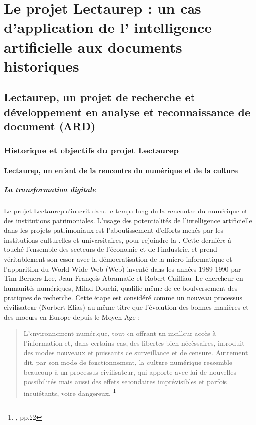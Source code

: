 \part{Le projet Lectaurep : un cas d'application de l' \og intelligence artificielle\fg{}  aux documents historiques}

\chapter{Lectaurep, un projet de recherche et développement en analyse et reconnaissance de document (ARD)}

\section{Historique et objectifs du projet Lectaurep}

\subsection{Lectaurep, un enfant de la rencontre du numérique et de la culture}

\subsubsection{La transformation digitale}

Le projet Lectaurep s'inscrit dans le temps long de la rencontre du numérique et des institutions patrimoniales. L'usage des potentialités de l'intelligence artificielle dans les projets patrimoniaux est l'aboutissement d'efforts menés par les institutions culturelles et universitaires, pour rejoindre la . Cette dernière à touché l'ensemble des secteurs de l'économie et de l'industrie, et prend véritablement son essor avec la démocratisation de la micro-informatique et l'apparition du World Wide Web (Web) inventé dans les années 1989-1990 par Tim Berners-Lee, Jean-François Abramatic et Robert Cailliau. 
Le chercheur en humanités numériques, Milad Douehi, qualifie même de  ce boulversement des pratiques de recherche. Cette étape est considéré comme un nouveau processus civilisateur (Norbert Elias) au même titre que l'évolution des bonnes manières et des moeurs en Europe depuis le Moyen-Age : 

\begin{quote}
    L'environnement numérique, tout en offrant un meilleur accès à l'information et, dans certains cas, des libertés bien nécéssaires, introduit des modes nouveaux et puissants de surveillance et de censure. Autrement dit, par son mode de fonctionnement, la culture numérique ressemble beaucoup à un processus civilisateur, qui apporte avec lui de nouvelles possibilités mais aussi des effets secondaires imprévisibles et parfois inquiétants, voire dangereux. \footnote{\cite{doueihi_grande_2011}, pp.22}
\end{quote}

